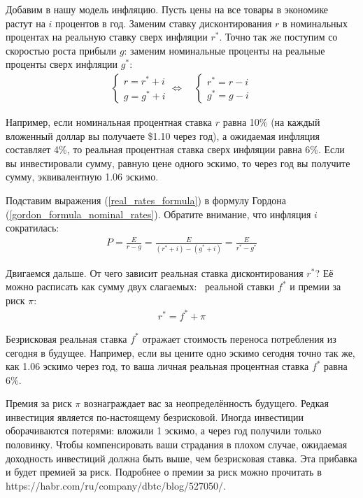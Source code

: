 Добавим в нашу модель инфляцию. Пусть цены на все товары в экономике растут на 
$i$ процентов в год. Заменим ставку дисконтирования $r$ в номинальных процентах 
на реальную ставку сверх инфляции $r^*$. Точно так же поступим со скоростью 
роста прибыли $g$: заменим номинальные проценты на реальные проценты сверх 
инфляции $g^*$:
\begin{align}
\begin{cases}
r = r^* + i \\
g = g^* + i
\end{cases}
\Leftrightarrow
\quad
\begin{cases}
r^* = r - i \\
g^* = g - i
\end{cases}
\label{real_rates_formula}
\end{align}

Например, если номинальная процентная ставка $r$ равна 10\% (на каждый 
вложенный доллар вы получаете \$1.10 через год), а ожидаемая инфляция 
составляет 4\%, то реальная процентная ставка сверх инфляции равна 6\%. Если вы 
инвестировали сумму, равную цене одного эскимо, то через год вы получите сумму, 
эквивалентную 1.06 эскимо.

Подставим выражения (\ref{real_rates_formula}) в формулу Гордона  
(\ref{gordon_formula_nominal_rates}). Обратите внимание, что инфляция $i$ 
сократилась:
\begin{align}
P = \frac{E}{r - g} = \frac{E}{(r^* + i) - (g^* + i)} =  \frac{E}{r^* - g^*} 
\label{gordon_formula_real_rates}
\end{align}

Двигаемся дальше. От чего зависит реальная ставка дисконтирования $r^*$? Её 
можно расписать как сумму двух слагаемых: \ 
реальной ставки $f^*$ и премии за риск $\pi$:
\begin{align}
r^* = f^* + \pi
\label{risk_premium_formula}
\end{align}

Безрисковая реальная ставка $f^*$ отражает стоимость переноса потребления из 
сегодня в будущее. Например, если вы цените одно эскимо сегодня точно так же, 
как 1.06 эскимо через год, то ваша личная реальная процентная ставка $f^*$ 
равна $6\%$.

Премия за риск $\pi$ вознаграждает вас за неопределённость будущего. Редкая 
инвестиция является по-настоящему безрисковой. Иногда инвестиции оборачиваются 
потерями: вложили 1 эскимо, а через год получили только половинку. Чтобы 
компенсировать ваши страдания в плохом случае, ожидаемая доходность инвестиций 
должна быть выше, чем безрисковая ставка. Эта прибавка и будет премией за риск. 
Подробнее о премии за риск можно прочитать в \urlnote{одной из недавних статей}
{https://habr.com/ru/company/dbtc/blog/527050/}.

